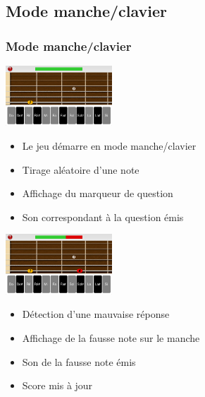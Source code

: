 \documentclass{beamer}
\begin{document}
	\subsection{Mode manche/clavier}
		\begin{frame}
			\frametitle{Mode manche/clavier}

			\begin{minipage}{0.35\linewidth}
				\includegraphics[width=4cm]{images/clavier_question2.png}
			\end{minipage}\hfill
			\begin{minipage}{0.6\linewidth}
				
				\begin{itemize}
					\item Le jeu démarre en mode manche/clavier
					\item Tirage aléatoire d'une note
					\item Affichage du marqueur de question
					\item Son correspondant à la question émis
				\end{itemize}
			\end{minipage}
			\bigbreak
			\pause
			\begin{minipage}{0.35\linewidth}
				\includegraphics[width=4cm]{images/clavier_bad_answer.png}
			\end{minipage}\hfill
			\begin{minipage}{0.6\linewidth}
				\begin{itemize}
					\item Détection d'une mauvaise réponse
					\item Affichage de la fausse note sur le manche
					\item Son de la fausse note émis
					\item Score mis à jour
				\end{itemize}
			\end{minipage}
			
		\end{frame}	
\end{document}
